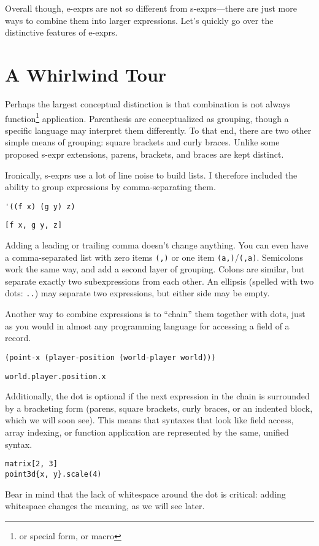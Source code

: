 \documentclass[11pt]{article} %
\begin{document}
Overall though, e-exprs are not so different from s-exprs---there are just more ways to combine them into larger expressions.
Let's quickly go over the distinctive features of e-exprs.

\section{A Whirlwind Tour}

Perhaps the largest conceptual distinction is that combination is not always function\footnote{or special form, or macro} application.
Parenthesis are conceptualized as grouping, though a specific language may interpret them differently.
To that end, there are two other simple means of grouping: square brackets and curly braces.
Unlike some proposed s-expr extensions, parens, brackets, and braces are kept distinct.

Ironically, s-exprs use a lot of line noise to build lists.
I therefore included the ability to group expressions by comma-separating them.
\begin{center}
\begin{verbatim}
'((f x) (g y) z)
\end{verbatim}
\begin{verbatim}
[f x, g y, z]
\end{verbatim}
\end{center}
Adding a leading or trailing comma doesn't change anything.
You can even have a comma-separated list with zero items \texttt{(,)} or one item \texttt{(a,)}/\texttt{(,a)}.
Semicolons work the same way, and add a second layer of grouping.
Colons are similar, but separate exactly two subexpressions from each other.
An ellipsis (spelled with two dots: \texttt{..}) may separate two expressions, but either side may be empty.

Another way to combine expressions is to ``chain'' them together with dots, just as you would in almost any programming language for accessing a field of a record.
\begin{center}
\begin{verbatim}
(point-x (player-position (world-player world)))
\end{verbatim}
\begin{verbatim}
world.player.position.x
\end{verbatim}
\end{center}
Additionally, the dot is optional if the next expression in the chain is surrounded by a bracketing form (parens, square brackets, curly braces, or an indented block, which we will soon see).
This means that syntaxes that look like field access, array indexing, or function application are represented by the same, unified syntax.
\begin{center}
\begin{verbatim}
matrix[2, 3]
point3d{x, y}.scale(4)
\end{verbatim}
\end{center}
Bear in mind that the lack of whitespace around the dot is critical: adding whitespace changes the meaning, as we will see later.
\end{document}
